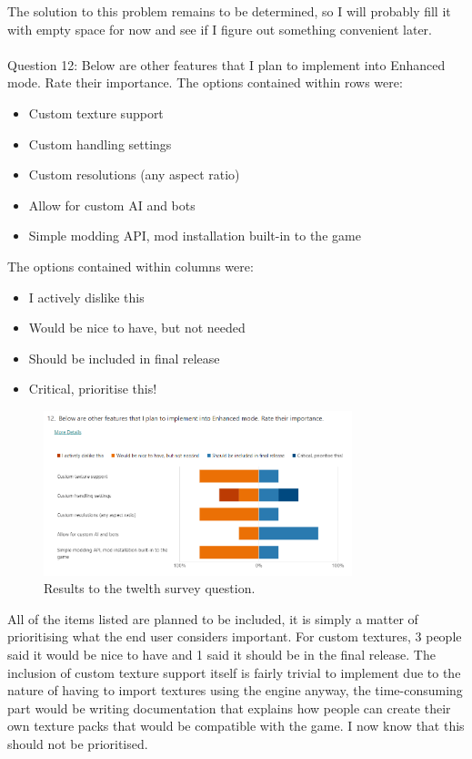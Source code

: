 \documentclass{article}
\begin{document}
The solution to this problem remains to be determined, so I will probably fill it with empty space for now and see if I figure out something convenient later.
\\\\
Question 12: Below are other features that I plan to implement into Enhanced mode. Rate their importance.
The options contained within rows were:
\begin{itemize}
    \renewcommand\labelitemi{--}
    \item Custom texture support
    \item Custom handling settings
    \item Custom resolutions (any aspect ratio)
    \item Allow for custom AI and bots
    \item Simple modding API, mod installation built-in to the game
\end{itemize}
The options contained within columns were:
\begin{itemize}
    \renewcommand\labelitemi{--}
    \item I actively dislike this
    \item Would be nice to have, but not needed
    \item Should be included in final release
    \item Critical, prioritise this!
\end{itemize}

\begin{figure}[h]
    \centering
    \includegraphics[width=0.8\textwidth]{survey12.png}
    \caption{\label{fig:survey12}Results to the twelth survey question.}
\end{figure}

All of the items listed are planned to be included, it is simply a matter of prioritising what the end user considers important.
For custom textures, 3 people said it would be nice to have and 1 said it should be in the final release. The inclusion of custom texture support itself is fairly trivial to implement due to the nature of having to import textures using the engine anyway, the time-consuming part would be writing documentation that explains how people can create their own texture packs that would be compatible with the game. I now know that this should not be prioritised.
\end{document}
